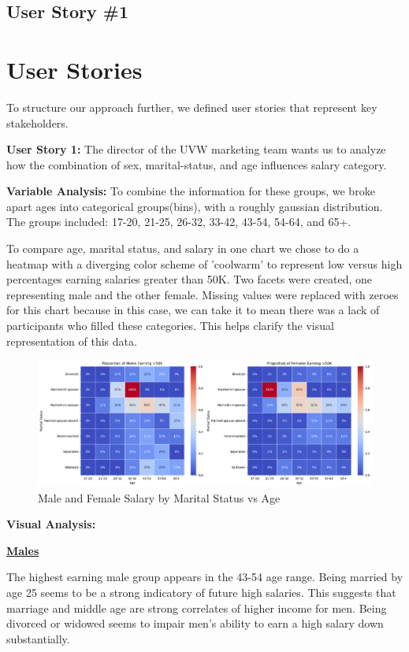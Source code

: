 \documentclass[journal,onecolumn]{IEEEtran}
\begin{document}
\subsection{User Story \#1}
\bigskip

\section{User Stories}
To structure our approach further, we defined user stories that represent key stakeholders.

\textbf{User Story 1:} The director of the UVW marketing team wants us to analyze how the
combination of sex, marital-status, and age influences salary category.

\textbf{Variable Analysis:} To combine the information for these groups, we broke apart ages into
categorical groups(bins), with a roughly gaussian distribution. The groups included:
17-20, 21-25, 26-32, 33-42, 43-54, 54-64, and 65+.

To compare age, marital status, and salary in one chart we chose to do a heatmap with a diverging color scheme of
'coolwarm' to represent low versus high percentages earning salaries greater than 50K. Two facets were created, one representing male and the other female. 
Missing values were replaced with zeroes for this chart because in this case, we can take it to mean there was a lack
of participants who filled these categories. This helps clarify the visual representation of this data.


\begin{figure}[h]
    \centering
    \includegraphics[width=1.05\linewidth]{mf_marital_agebins.png}  %
    \caption{Male and Female Salary by Marital Status vs Age}
    \label{fig:mf_marital_agebins}
\end{figure}


\textbf{Visual Analysis:} 
\medskip
    
\underline{\textbf{Males}}

The highest earning male group appears in the 43-54 age range.
Being married by age 25 seems to be a strong indicatory of future high salaries.
This suggests that marriage and middle age are strong correlates of higher income for men.
Being divorced or widowed seems to impair men's ability to earn a high salary down substantially.
\end{document}
